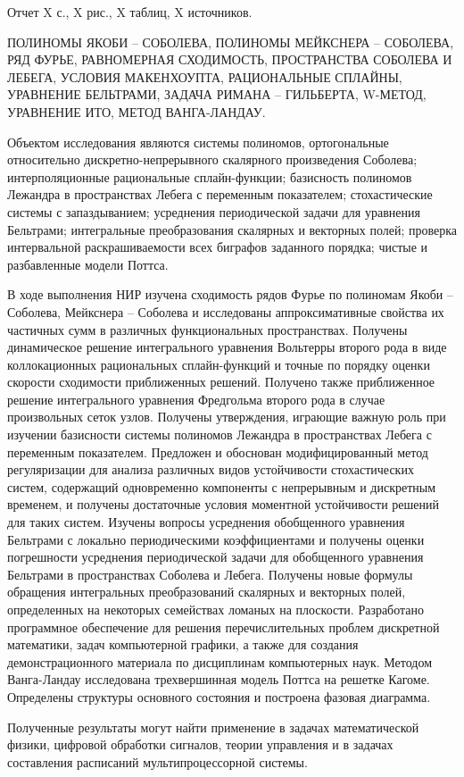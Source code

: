 \Referat %

Отчет X с., X рис., X таблиц, X источников.

\MakeUppercase{полиномы Якоби -- Соболева, полиномы Мейкснера -- Соболева, ряд Фурье, равномерная сходимость, пространства Соболева и Лебега, условия Макенхоупта, рациональные сплайны, уравнение Бельтрами, задача Римана -- Гильберта, W-метод, уравнение Ито, метод Ванга-Ландау.
}

Объектом исследования являются системы полиномов, ортогональные относительно дискретно-непрерывного скалярного произведения Соболева; интерполяционные рациональные сплайн-функции;
базисность полиномов Лежандра в пространствах Лебега с переменным показателем;
стохастические системы с запаздыванием;
усреднения периодической задачи для уравнения Бельтрами;
интегральные преобразования скалярных и векторных полей;
проверка интервальной раскрашиваемости всех биграфов заданного порядка;
чистые и разбавленные модели Поттса.

В ходе выполнения НИР изучена сходимость рядов Фурье по полиномам Якоби -- Соболева, Мейкснера -- Соболева и исследованы аппроксимативные свойства их частичных сумм в различных функциональных пространствах. Получены динамическое решение интегрального уравнения Вольтерры второго рода в виде коллокационных рациональных сплайн-функций и точные по порядку оценки скорости сходимости приближенных решений. Получено также приближенное решение интегрального уравнения Фредгольма второго рода в случае произвольных сеток узлов.
Получены утверждения, играющие важную роль при изучении базисности системы полиномов Лежандра в пространствах Лебега с переменным показателем.
Предложен и обоснован модифицированный метод регуляризации для анализа различных видов устойчивости стохастических систем, содержащий одновременно компоненты с непрерывным и дискретным временем, и получены достаточные условия моментной устойчивости решений для таких систем.
Изучены вопросы усреднения обобщенного уравнения Бельтрами с локально периодическими коэффициентами и получены оценки погрешности усреднения периодической задачи для обобщенного уравнения Бельтрами в пространствах Соболева и Лебега.
Получены новые формулы обращения интегральных преобразований скалярных и векторных полей, определенных на некоторых семействах ломаных на плоскости.
Разработано программное обеспечение для решения перечислительных проблем дискретной математики, задач компьютерной графики, а также для создания демонстрационного материала по дисциплинам компьютерных наук.
Методом Ванга-Ландау исследована трехвершинная модель Поттса на решетке Кагоме. 
Определены структуры основного состояния и построена фазовая диаграмма. 

Полученные результаты могут найти применение в задачах математической физики, цифровой обработки сигналов, теории управления и в задачах составления расписаний мультипроцессорной системы.
